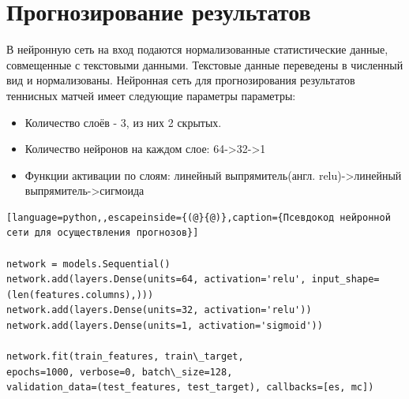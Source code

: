 \section{Прогнозирование результатов}
В нейронную сеть на вход подаются нормализованные статистические данные, совмещенные с текстовыми данными. Текстовые данные переведены в численный вид и нормализованы.
Нейронная сеть для прогнозирования результатов теннисных матчей имеет следующие параметры параметры:
\begin{itemize}
	\item Количество слоёв - 3, из них 2 скрытых.
	\item Количество нейронов на каждом слое: 64->32->1
	\item Функции активации по слоям:
	 линейный выпрямитель(англ. relu)->линейный выпрямитель->сигмоида
\end{itemize}
\begin{lstlisting}[language=python,,escapeinside={(@}{@)},caption={Псевдокод нейронной сети для осуществления прогнозов}] 

network = models.Sequential()
network.add(layers.Dense(units=64, activation='relu', input_shape=(len(features.columns),)))
network.add(layers.Dense(units=32, activation='relu'))
network.add(layers.Dense(units=1, activation='sigmoid'))

network.fit(train_features, train\_target, 
epochs=1000, verbose=0, batch\_size=128, 
validation_data=(test_features, test_target), callbacks=[es, mc]) 

\end{lstlisting}